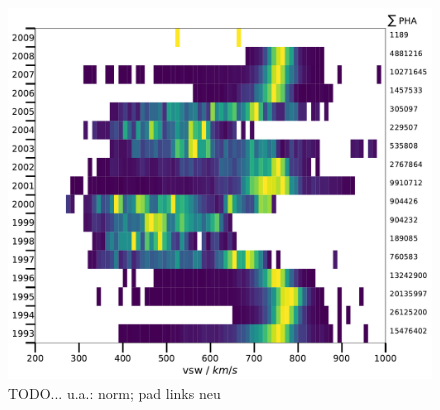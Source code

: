 \begin{figure}[h]
	\includegraphics[width=1\textwidth]{Figures/vsw_all_years_brw.pdf}
	\centering
	\caption{TODO... u.a.: norm; pad links neu}
	\label{fig:vsw_years}
\end{figure}


%
